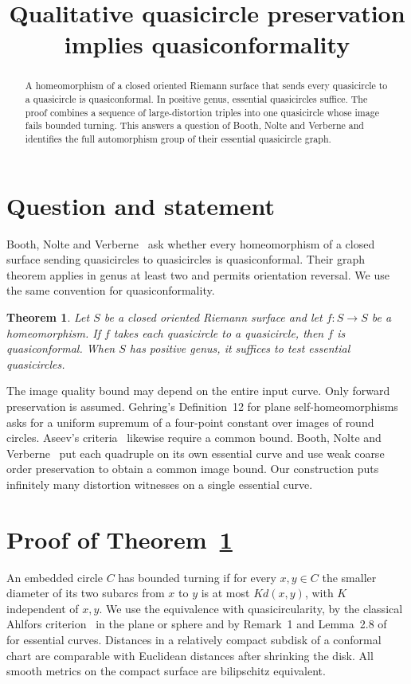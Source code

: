 \documentclass[11pt]{amsart}
\title[Qualitative quasicircle preservation]{Qualitative quasicircle preservation implies quasiconformality}
\date{}
\newtheorem{theorem}{Theorem}
\begin{document}
\begin{abstract}
A homeomorphism of a closed oriented Riemann surface that sends every
quasicircle to a quasicircle is quasiconformal. In positive genus,
essential quasicircles suffice. The proof combines a sequence of
large-distortion triples into one quasicircle whose image fails bounded
turning. This answers a question of Booth, Nolte and Verberne and identifies
the full automorphism group of their essential quasicircle graph.
\end{abstract}
\maketitle

\section{Question and statement}
Booth, Nolte and Verberne~\cite[Section 1]{BNV} ask whether every
homeomorphism of a closed surface sending quasicircles to quasicircles
is quasiconformal. Their graph theorem applies in genus at least two
and permits orientation reversal. We use the same convention for
quasiconformality.

\begin{theorem}\label{main}
Let \(S\) be a closed oriented Riemann surface and let \(f:S\to S\) be
a homeomorphism. If \(f\) takes each quasicircle to a quasicircle, then
\(f\) is quasiconformal. When \(S\) has positive genus, it suffices to
test essential quasicircles.
\end{theorem}

The image quality bound may depend on the entire input curve. Only
forward preservation is assumed. Gehring's Definition~12 for plane
self-homeomorphisms~\cite{Gehring} asks for a uniform supremum of a
four-point constant over images of round circles. Aseev's
criteria~\cite{Aseev2014,Aseev2016} likewise require a common bound.
Booth, Nolte and Verberne~\cite[Section 5.3]{BNV} put each quadruple
on its own essential curve and use weak coarse order preservation
to obtain a common image bound. Our construction puts infinitely
many distortion witnesses on a single essential curve.

\section{Proof of Theorem~\ref{main}}
An embedded circle \(C\) has bounded turning if for every \(x,y\in C\)
the smaller diameter of its two subarcs from \(x\) to \(y\) is
at most \(K d(x,y)\), with \(K\) independent of \(x,y\). We use
the equivalence with quasicircularity, by the classical Ahlfors
criterion~\cite{Ahlfors} in the plane or sphere and by
Remark~1 and Lemma~2.8 of~\cite{BNV} for essential curves.
Distances in a relatively compact subdisk of a conformal chart
are comparable with Euclidean distances after shrinking the disk.
All smooth metrics on the compact surface are bilipschitz equivalent.
\end{document}
